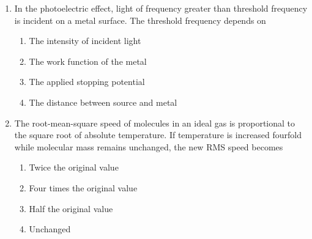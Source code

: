 \documentclass[12pt]{article}
\begin{document}
\begin{enumerate}[leftmargin=*]
\item In the photoelectric effect, light of frequency greater than threshold frequency is incident on a metal surface. The threshold frequency depends on

\begin{enumerate}
\item The intensity of incident light
\item The work function of the metal
\item The applied stopping potential
\item The distance between source and metal
\end{enumerate}

\item The root-mean-square speed of molecules in an ideal gas is proportional to the square root of absolute temperature. If temperature is increased fourfold while molecular mass remains unchanged, the new RMS speed becomes

\begin{enumerate}
\item Twice the original value
\item Four times the original value
\item Half the original value
\item Unchanged
\end{enumerate}

\end{enumerate}
\end{document}
